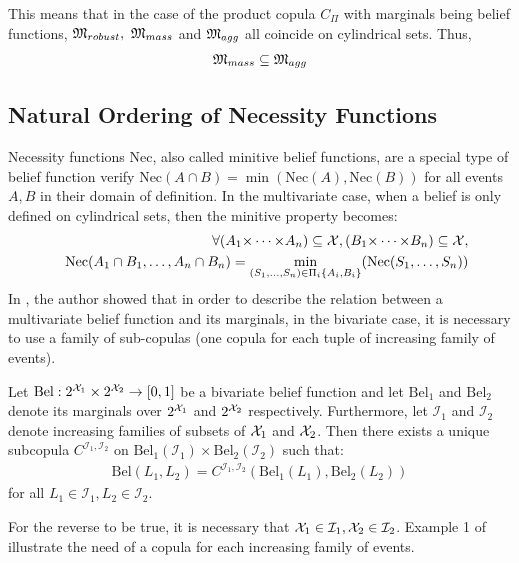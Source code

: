 This means that in the case of the product copula $C_\Pi$ with marginals being belief functions, ${\mathfrak{M}}_{robust},~{\mathfrak{M}}_{mass}$ and ${\mathfrak{M}}_{agg}$ all coincide on cylindrical sets. Thus,
\begin{eqnarray*}
    {\mathfrak{M}}_{mass}\subseteq{\mathfrak{M}}_{agg}
\end{eqnarray*}

\subsection{Natural Ordering of Necessity Functions}\label{subsec:necessity_functions}
Necessity functions $\mathrm{Nec}$, also called minitive belief functions, are a special type of belief function verify $\mathrm{Nec}(A\cap B) =\min(\mathrm{Nec}(A), \mathrm{Nec}(B))$ for all events $A, B$ in their domain of definition. In the multivariate case, when a belief is only defined on cylindrical sets, then the minitive property becomes:
\begin{eqnarray}
    &&\forall (A_1{\times\dots\times} A_n)\subseteq{\mathcal{X}}, (B_1{\times\dots\times} B_n)\subseteq{\mathcal{X}},\nonumber\\
    &&\mathrm{Nec}(A_1\cap B_1,\dots, A_n\cap B_n) = \min_{(S_1,\dots,S_n)\in\Pi_i\{A_i,B_i\}}(\mathrm{Nec}(S_1, \dots, S_n))
\end{eqnarray}
In \cite{schmelzer_joint_2015}, the author showed that in order to describe the relation between a multivariate belief function and its marginals, in the bivariate case, it is necessary to use a family of sub-copulas (one copula for each tuple of increasing family of events).

\begin{theorem}\label{theorem:sklar_belief}
    Let $\mathrm{Bel}:2^{{\mathcal{X}}_1}\times2^{{\mathcal{X}}_2}\rightarrow[0,1]$ be a bivariate belief function and let $\mathrm{Bel}_1$ and $\mathrm{Bel}_2$ denote its marginals over $2^{{\mathcal{X}}_1}$ and $2^{{\mathcal{X}}_2}$ respectively. Furthermore, let $\mathcal{I}_1$ and $\mathcal{I}_2$ denote increasing families of subsets of ${\mathcal{X}}_1$ and ${\mathcal{X}}_2$. Then there exists a unique subcopula $C^{\mathcal{I}_1,\mathcal{I}_2}$ on  $\mathrm{Bel}_1(\mathcal{I}_1)\times \mathrm{Bel}_2(\mathcal{I}_2)$ such that:
    \begin{eqnarray}
        \mathrm{Bel}(L_1, L_2) = C^{\mathcal{I}_1,\mathcal{I}_2}(\mathrm{Bel}_1(L_1), \mathrm{Bel}_2(L_2))
    \end{eqnarray}
    for all $L_1\in\mathcal{I}_1,L_2\in\mathcal{I}_2$.
\end{theorem}
For the reverse to be true, it is necessary that ${\mathcal{X}}_1\in\mathcal{I}_1, {\mathcal{X}}_2\in\mathcal{I}_2$. Example 1 of \cite{schmelzer_joint_2015} illustrate the need of a copula for each increasing family of events.

